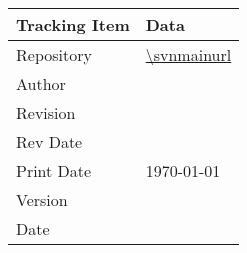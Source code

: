 \begin{table}[htbp]
	\centering
		\begin{tabular}{|p{1.5in}|p{4.9in}|}
		\hline
			{\bfseries Tracking Item}  &  {\bfseries Data} \\
		\hline		
		\hline
			Repository         & \url{\svnmainurl}  \\
		\hline
			Author         & \svnauthor  \\			
		\hline
			Revision       & \svnrev     \\	
		\hline
			Rev Date       & \svndate    \\	
		\hline	
			Print Date     & \today{} \currenttime    \\	
		\hline
			\KNEADdocumentClsName\break Version     & \KNEADdocumentClsVersion    \\	
		\hline	
			\KNEADdocumentClsName\break Date        & \KNEADdocumentClsDate   \\	
		\hline
		\hline						
    \end{tabular}
\end{table}